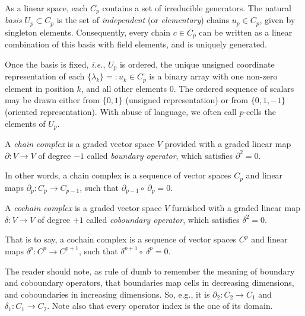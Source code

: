 \begin{definition}
As a linear space, each $C_p$ contains a set of irreducible generators.
The natural \emph{basis} $U_p \subset C_p$  is the set of \emph{independent} (or \emph{elementary}) chains $u_p \in C_p$, given
by singleton elements. Consequently, every chain $c\in C_p$ can be written as 
a linear combination of this basis with field elements, and is uniquely generated. 
\end{definition}

Once  the  basis is fixed, \emph{i.e.}, $U_p$ is ordered, the unique unsigned coordinate
representation of each $\{\lambda_k\} =: u_k \in C_p$ is a binary array with one non-zero element in position $k$, and all other elements 0. The ordered
sequence of scalars may be drawn either from $\{0,1\}$ (unsigned representation) or from
$\{0,1,-1\}$ (oriented representation). 
With abuse of language, we
often call $p$-cells the elements of $U_p$.


\begin{definition}
A \emph{chain complex} is a graded vector  space $V$ provided with a graded
linear map $\partial : V \to V$ of degree $-1$ called
\emph{boundary operator}, which satisfies $\partial^2 = 0$. 
\end{definition}


In other words, a chain complex
is a sequence of vector spaces $C_p$ and linear maps $\partial_p : C_p \to C_{p-1}$,
such that $\partial_{p-1} \circ\ \partial_{p} = 0$. 


\begin{definition}
A \emph{cochain complex} is a graded vector space $V$ furnished with a graded
linear map $\delta : V \to V$ of degree $+1$ 
called \emph{coboundary operator},  which satisfies $\delta^2 = 0$. 
\end{definition}

That is to say, a cochain complex is a
sequence of vector spaces $C^p$ and linear maps $\delta^p : C^p \to C^{p+1}$,
such that $\delta^{p+1} \circ\ \delta^{p} = 0$. 

\begin{remark}
The reader should note, as rule of dumb to remember the meaning of boundary and coboundary operators, that boundaries map cells in decreasing dimensions, and coboundaries in increasing dimensions. So, e.g., it is $\partial_2: C_2\to C_1$ and $\delta_1: C_1\to C_2$. Note also that every operator index is the one of its domain.
\end{remark}


